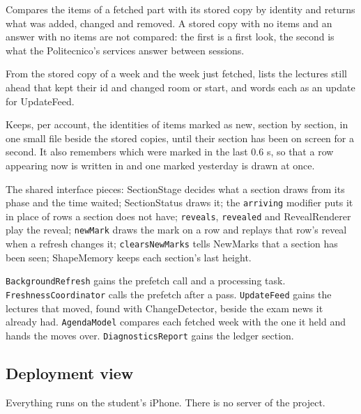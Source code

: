 \begin{description}[style=nextline, leftmargin=1.5em]
  \item[ChangeDetector (new)] Compares the items of a fetched part with its stored copy by identity and returns what was added, changed and removed. A stored copy with no items and an answer with no items are not compared: the first is a first look, the second is what the Politecnico's services answer between sessions.
  \item[LectureMoves (new)] From the stored copy of a week and the week just fetched, lists the lectures still ahead that kept their id and changed room or start, and words each as an update for UpdateFeed.
  \item[NewMarks (new)] Keeps, per account, the identities of items marked as new, section by section, in one small file beside the stored copies, until their section has been on screen for a second. It also remembers which were marked in the last 0.6 s, so that a row appearing now is written in and one marked yesterday is drawn at once.
  \item[Section kit (new)] The shared interface pieces: SectionStage decides what a section draws from its phase and the time waited; SectionStatus draws it; the \texttt{arriving} modifier puts it in place of rows a section does not have; \texttt{reveals}, \texttt{revealed} and RevealRenderer play the reveal; \texttt{newMark} draws the mark on a row and replays that row's reveal when a refresh changes it; \texttt{clearsNewMarks} tells NewMarks that a section has been seen; ShapeMemory keeps each section's last height.
  \item[Existing services] \texttt{BackgroundRefresh} gains the prefetch call and a processing task. \texttt{FreshnessCoordinator} calls the prefetch after a pass. \texttt{UpdateFeed} gains the lectures that moved, found with ChangeDetector, beside the exam news it already had. \texttt{AgendaModel} compares each fetched week with the one it held and hands the moves over. \texttt{DiagnosticsReport} gains the ledger section.
\end{description}

\subsection{Deployment view}
Everything runs on the student's iPhone. There is no server of the project.

